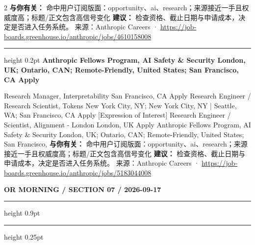 \documentclass[10.5pt]{ctexart}
\begin{document}
\begin{multicols}{2}
\textbf{与你有关：} 命中用户订阅版面：opportunity、ai、research；来源接近一手且权威度高；标题/正文包含高信号变化
\textbf{建议：} 检查资格、截止日期与申请成本，决定是否进入任务系统。
{\footnotesize\color{ormuted} 来源：Anthropic Careers · \url{https://job-boards.greenhouse.io/anthropic/jobs/4610158008}}
\vspace{2mm}
\hrule height 0.2pt
\vspace{2mm}
{\large\bfseries Anthropic Fellows Program, AI Safety \& Security London, UK; Ontario, CAN; Remote-Friendly, United States; San Francisco, CA Apply}\par
[Expression of Interest] Research Manager, Interpretability San Francisco, CA Apply Research Engineer / Research Scientist, Tokens New York City, NY; New York City, NY | Seattle, WA; San Francisco, CA Apply [Expression of Interest] Research Engineer / Scientist, Alignment - London London, UK Apply Anthropic Fellows Program, AI Safety \& Security London, UK; Ontario, CAN; Remote-Friendly, United States; San Francisco, 
\textbf{与你有关：} 命中用户订阅版面：opportunity、ai、research；来源接近一手且权威度高；标题/正文包含高信号变化
\textbf{建议：} 检查资格、截止日期与申请成本，决定是否进入任务系统。
{\footnotesize\color{ormuted} 来源：Anthropic Careers · \url{https://job-boards.greenhouse.io/anthropic/jobs/5183044008}}
\end{multicols}
\newpage
{\small\bfseries OR MORNING / SECTION 07 / 2026-09-17}
\vspace{2mm}
\hrule height 0.9pt
\vspace{1.5mm}
\hrule height 0.25pt
\vspace{4mm}
\end{document}

